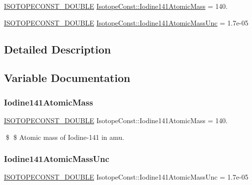 \begin{DoxyCompactItemize}
\item 
\mbox{\hyperlink{group___isotope_const-_macros_ga8f45a7272ce02c0b4c65c44636ed719a}{I\+S\+O\+T\+O\+P\+E\+C\+O\+N\+S\+T\+\_\+\+D\+O\+U\+B\+LE}} \mbox{\hyperlink{group___isotope_const-_iodine-_i141_gacd7a3991c91f79187ce6cc7b0fd194dc}{Isotope\+Const\+::\+Iodine141\+Atomic\+Mass}} = 140.
\item 
\mbox{\hyperlink{group___isotope_const-_macros_ga8f45a7272ce02c0b4c65c44636ed719a}{I\+S\+O\+T\+O\+P\+E\+C\+O\+N\+S\+T\+\_\+\+D\+O\+U\+B\+LE}} \mbox{\hyperlink{group___isotope_const-_iodine-_i141_ga3872f4563c944cec5fdbc944f8bee046}{Isotope\+Const\+::\+Iodine141\+Atomic\+Mass\+Unc}} = 1.\+7e-\/05
\end{DoxyCompactItemize}


\subsection{Detailed Description}


\subsection{Variable Documentation}
\mbox{\label{group___isotope_const-_iodine-_i141_gacd7a3991c91f79187ce6cc7b0fd194dc}} 
\subsubsection{\texorpdfstring{Iodine141\+Atomic\+Mass}{Iodine141AtomicMass}}
{\footnotesize\ttfamily \mbox{\hyperlink{group___isotope_const-_macros_ga8f45a7272ce02c0b4c65c44636ed719a}{I\+S\+O\+T\+O\+P\+E\+C\+O\+N\+S\+T\+\_\+\+D\+O\+U\+B\+LE}} Isotope\+Const\+::\+Iodine141\+Atomic\+Mass = 140.}

\$ \$ Atomic mass of Iodine-\/141 in amu. \mbox{\label{group___isotope_const-_iodine-_i141_ga3872f4563c944cec5fdbc944f8bee046}} 
\subsubsection{\texorpdfstring{Iodine141\+Atomic\+Mass\+Unc}{Iodine141AtomicMassUnc}}
{\footnotesize\ttfamily \mbox{\hyperlink{group___isotope_const-_macros_ga8f45a7272ce02c0b4c65c44636ed719a}{I\+S\+O\+T\+O\+P\+E\+C\+O\+N\+S\+T\+\_\+\+D\+O\+U\+B\+LE}} Isotope\+Const\+::\+Iodine141\+Atomic\+Mass\+Unc = 1.\+7e-\/05}

